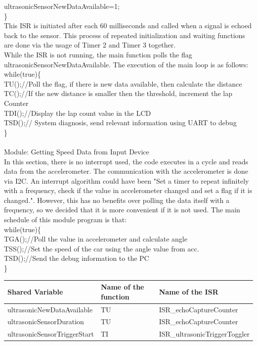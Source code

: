 \documentclass{article}
\begin{document}
ultrasonicSensorNewDataAvailable=1; \\
\}\\
This ISR is initiated after each 60 milliseconds and called when a signal is echoed back to the sensor.
This process of repeated initialization and waiting functions are done via the usage of Timer 2 and Timer 3
together.\\
While the ISR is not running, the main function polls the flag ultrasonicSensorNewDataAvailable.
The execution of the main loop is as follows:\\
while(true)\{\\
TU();//Poll the flag, if there is new data available, then calculate the distance\\
TC();//If the new distance is smaller then the threshold, increment the lap Counter\\
TDI();//Display the lap count value in the LCD\\
TSD();// System diagnosis, send relevant information using UART to debug\\
\}\\
\\
{\huge {Module: Getting Speed Data from Input Device}}
\\
In this section, there is no interrupt used, the code executes in a cycle and reads data from the
accelerometer. The communication with the accelerometer is done via I2C. An interrupt algorithm could have
been "Set a timer to repeat infinitely with a frequency, check if the value in accelerometer changed and
set a flag if it is changed.". However, this has no benefits over polling the data itself with a frequency,
so we decided that it is more convenient if it is not used. The main schedule of this module program is that:\\
while(true)\{\\
TGA();//Poll the value in accelerometer and calculate angle\\
TSS();//Set the speed of the car using the angle value from acc.\\
TSD();//Send the debug information to the PC\\
\}
\\[0.5in]
\begin{tabular}{| C{4cm} | C{4cm} | C{5cm} |}
\hline
Shared Variable&Name of the function&Name of the ISR\\
\hline
ultrasonicNewDataAvailable&TU& ISR\_echoCaptureCounter\\
\hline
ultrasonicSensorDuration&TU&ISR\_echoCaptureCounter\\
\hline
ultrasonicSensorTriggerStart&TI&ISR\_ultrasonicTriggerToggler\\
\hline
\end{tabular}
\end{document}
